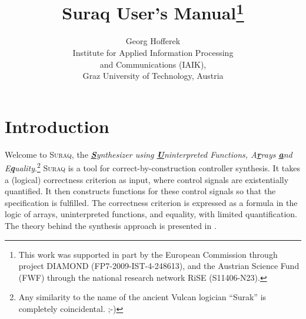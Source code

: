 \documentclass[a4paper]{article}
\newcommand\suraq{\mbox{\textsc{Suraq}}\xspace}
\newcommand\textbful[1]{\textbf{\underline{#1}}}
\begin{document}
\title{Suraq User's Manual\thanks{This work was supported in part by the
European Commission through project DIAMOND (FP7-2009-IST-4-248613),
and the Austrian Science Fund (FWF) through the national research
network RiSE (S11406-N23).}}

\author{Georg Hofferek\\
Institute for Applied Information Processing\\and Communications
(IAIK),\\
Graz University of Technology, Austria}
\date{}
\maketitle


\section{Introduction} \label{sec:introduction}

Welcome to \suraq, the \emph{\textbful{S}ynthesizer using
\textbful{U}ninterpreted Functions, A\textbful{r}rays \textbful{a}nd
E\textbful{q}uality}.\footnote{Any similarity to the name of the
ancient Vulcan logician ``Surak'' \cite{Memory_Alpha_Surak} is
completely coincidental. ;-)} \suraq is a tool for
correct-by-construction controller synthesis. It takes a (logical)
correctness criterion as input, where control signals are
existentially quantified. It then constructs functions for these
control signals so that the specification is fulfilled. The
correctness criterion is expressed as a formula in the logic of
arrays, uninterpreted functions, and equality, with limited
quantification. The theory behind the synthesis approach is presented
in \cite{Hoffer11}.



\end{document}
